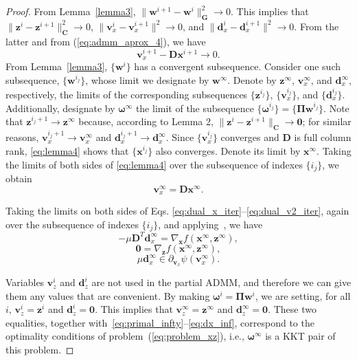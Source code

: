 \documentclass[10pt,twocolumn,twoside]{IEEEtran}
\newcommand{\x}{\mathbf{x}} %
\newcommand{\z}{\mathbf{z}} %
\newcommand{\vs}{\mathbf{v}} %
\newcommand{\dv}{\mathbf{d}} %
\newcommand{\D}{\mathbf{D}} %
\newcommand{\wt}{\mathbf{w}} %
\newcommand{\C}{\mathbf{C}} %
\newcommand{\G}{\mathbf{G}} %
\begin{document}
\begin{proof}
	From Lemma~\ref{lemma3}, $\|\wt^{i+1} - \wt^i \|^2_{\G} \to 0$. This implies that $\| \z^i - \z^{i+1} \|^2_\C \to 0$, $\| \vs_x^i - \vs_x^{i+1} \|^2 \to 0$, and $\| \dv_x^i - \dv_x^{i+1} \|^2 \to 0$. From the latter and from (\ref{eq:admm_aprox_4}), we have
	\begin{equation} \label{eq:lemma4}
	\vs_x^{i+1} - \D \x^{i+1} \to 0.
	\end{equation}
	From Lemma~\ref{lemma3}, $\{\wt^i\}$ has a convergent subsequence. Consider one such subsequence, $\{\wt^{i_j}\}$, whose limit we designate by $\wt^{\infty}$. Denote by $\z^{\infty}$, $\vs_x^{\infty}$, and $\dv_x^{\infty}$, respectively, the limits of the corresponding subsequences $\{\z^{i_j}\}$, $\{\vs_x^{i_j}\}$, and $\{\dv_x^{i_j}\}$. Additionally, designate by $\bm{\omega}^{\infty}$ the limit of the subsequence $\{\bm{\omega}^{i_j}\} = \{\bm{\Pi} \wt^{i_j}\}$. Note that $\z^{i_j+1} \to \z^\infty$ because, according to Lemma 2, $\|\z^i - \z^{i+1}\|_\C \to \mathbf 0$; for similar reasons, $\vs_x^{i_j+1} \to \vs_x^\infty$ and $\dv_x^{i_j+1} \to \dv_x^\infty$. Since $\{\vs_x^{i_j}\}$ converges and $\D$ is full column rank, \eqref{eq:lemma4} shows that $\{\x^{i_j}\}$ also converges. Denote its limit by $\x^\infty$. Taking the limits of both sides of \eqref{eq:lemma4} over the subsequence of indexes $\{i_j\}$, we obtain
	\begin{equation} \label{eq:primal_infty}
	\vs_x^{\infty} = \D \x^{\infty}.
	\end{equation}
	
	Taking the limits on both sides of Eqs. \eqref{eq:dual_x_iter}--\eqref{eq:dual_v2_iter}, again over the subsequence of indexes $\{i_j\}$, and applying~\cite[Theorem 24.4]{Rockafellar1970}, we have
	\begin{equation}
	- \mu \D^{T} \dv_x^{\infty} = \nabla_{\x} f(\x^{\infty}, \z^{\infty}),
	\end{equation}
	\begin{equation}
	\mathbf 0 = \nabla_\z f(\x^{\infty}, \z^{\infty}),
	\end{equation}
	\begin{equation} \label{eq:dx_inf}
	\mu \dv_x^{\infty} \in \partial_{\vs_x} \psi(\vs_x^{\infty}).
	\end{equation}
	
	Variables $\vs_z^i$ and $\dv_z^i$ are not used in the partial ADMM, and therefore we can give them any values that are convenient. By making $\bm{\omega}^i = \bm{\Pi} \wt^i$, we are setting, for all $i$, $\vs_z^i = \z^i$ and $\dv_z^i = \mathbf 0$. This implies that $\vs_z^{\infty} = \z^{\infty}$ and $\dv_z^{\infty} = \mathbf 0$. These two equalities, together with~\eqref{eq:primal_infty}--\eqref{eq:dx_inf}, correspond to the optimality conditions of problem~(\ref{eq:problem_xz}), i.e., $\bm{\omega}^{\infty}$ is a KKT pair of this problem.
\end{proof}
\end{document}
